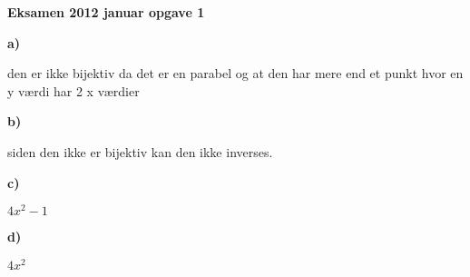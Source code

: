 \documentclass{article}
\begin{document}
\textbf{Eksamen 2012 januar opgave 1}

\textbf{a)}

den er ikke bijektiv da det er en parabel og at den har mere end et punkt
hvor en y værdi har 2 x værdier 

\textbf{b)}

siden den ikke er bijektiv kan den ikke inverses.

\textbf{c)}

$4x^2-1$

\textbf{d)}

$4x^2$
\end{document}
